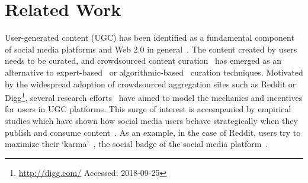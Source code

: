 \section{Related Work}
User-generated content (UGC) has been identified as a fundamental component of social media platforms and Web 2.0 in general~\cite{kaplan2010users}. The content created by users needs to be curated, and crowdsourced content curation~\cite{askalidis2013theoretical} has emerged as an alternative to expert-based~\cite{stanoevska2012content} or algorithmic-based~\cite{rader2015understanding} curation techniques. Motivated by the widespread adoption of crowdsourced aggregation sites such as Reddit or Digg\footnote{\url{http://digg.com/} Accessed: 2018-09-25}, several research efforts~\cite{das2010ranking,ghosh2011incentivizing,abbassi2014distributed} have aimed to model the mechanics and incentives for users in UGC platforms. This surge of interest is accompanied by empirical studies which have shown how
social media users behave strategically when they publish and consume content~\cite{may2014filter}. As an example, in the case of Reddit, users try to maximize their `karma'~\cite{bergstrom2011don}, the social badge of the social media platform~\cite{anderson2013steering}.

